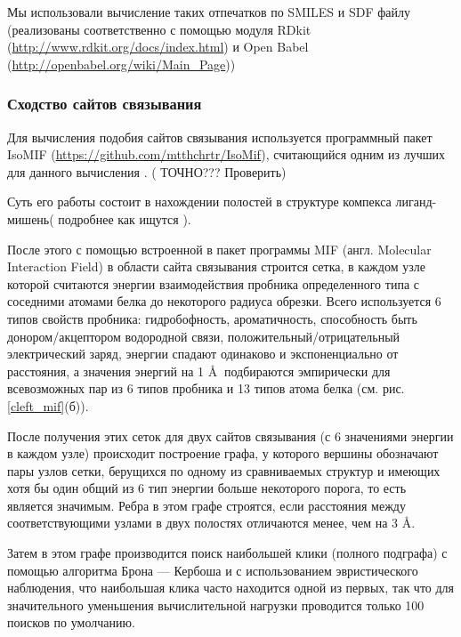 \documentclass[a4paper,14pt]{article}         %
\begin{document}
Мы использовали вычисление таких отпечатков по SMILES и SDF файлу (реализованы соответственно с помощью модуля \linebreak RDkit (\href{http://www.rdkit.org/docs/index.html}{http://www.rdkit.org/docs/index.html}) и \linebreak Open Babel (\href{http://openbabel.org/wiki/Main\_Page}{http://openbabel.org/wiki/Main\_Page}))

\subsubsection{Сходство сайтов связывания}
Для вычисления подобия сайтов связывания используется программный пакет IsoMIF (\href{https://github.com/mtthchrtr/IsoMif}{https://github.com/mtthchrtr/IsoMif})\cite{Chartier2015}, считающийся одним из лучших для данного вычисления \cite{Ehrt2016}. (\color{orange} ТОЧНО??? Проверить\color{black})

Суть его работы состоит в нахождении полостей в структуре компекса лиганд-мишень\cite{Gaudreault2015, Laskowski1995}(\color{orange} подробнее как ищутся \color{black}). 

После этого с помощью встроенной в пакет программы MIF (англ. Molecular Interaction Field) в области сайта связывания строится сетка, в каждом узле которой считаются энергии взаимодействия пробника определенного типа с соседними атомами белка до некоторого радиуса обрезки. Всего используется 6 типов свойств пробника: гидробофность, ароматичность, способность быть донором/акцептором водородной связи, положительный/отрицательный электрический заряд, энергии спадают одинаково и экспоненциально от расстояния, а значения энергий на 1 \AA $\:$ подбираются эмпирически для всевозможных пар из 6 типов пробника и 13 типов атома белка (см. рис. \ref{cleft_mif}(б)).

После получения этих сеток для двух сайтов связывания (с 6 значениями энергии в каждом узле) происходит построение графа, у которого вершины обозначают пары узлов сетки, берущихся по одному из сравниваемых структур и имеющих хотя бы один общий из 6 тип энергии больше некоторого порога, то есть является значимым. Ребра в этом графе строятся, если расстояния между соответствующими узлами в двух полостях отличаются менее, чем на 3 \AA. 

Затем в этом графе производится поиск наибольшей клики (полного подграфа) с помощью алгоритма Брона — Кербоша \cite{Bron1973, Tomita2006} и с использованием эвристического наблюдения, что наибольшая клика часто находится одной из первых, так что для значительного уменьшения вычислительной нагрузки проводится только 100 поисков по умолчанию. 
\end{document}
